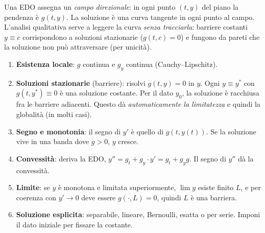 \documentclass[11pt,a4paper,openany]{book}
\theoremstyle{plain}
\theoremstyle{definition}
\theoremstyle{remark}
\begin{document}
\begin{nota}[title={Intuizione}]
Una EDO assegna un \emph{campo direzionale}: in ogni punto $(t,y)$
del piano la pendenza \`e $g(t,y)$. La soluzione \`e una curva tangente
in ogni punto al campo. L'analisi qualitativa serve a leggere la curva
\emph{senza tracciarla}: barriere costanti $y\equiv c$ corrispondono
a soluzioni stazionarie ($g(t,c)=0$) e fungono da pareti che la soluzione
non pu\`o attraversare (per unicit\`a).
\end{nota}

\begin{ricetta}[title={Cauchy qualitativo}]
\begin{enumerate}
\item \textbf{Esistenza locale}: $g$ continua e $g_y$ continua (Cauchy--Lipschitz).
\item \textbf{Soluzioni stazionarie} (barriere): risolvi $g(t,y)=0$ in $y$.
   Ogni $y\equiv y^*$ con $g(t,y^*)\equiv 0$ \`e una soluzione costante.
   Per il dato $y_0$, la soluzione \`e racchiusa fra le barriere
   adiacenti. Questo d\`a \emph{automaticamente la limitatezza} e quindi
   la globalit\`a (in molti casi).
\item \textbf{Segno e monotonia}: il segno di $y'$ \`e quello di
   $g(t,y(t))$. Se la soluzione vive in una banda dove $g>0$,
   $y$ cresce.
\item \textbf{Convessit\`a}: deriva la EDO,
   $y''=g_t+g_y\cdot y'=g_t+g_y g$. Il segno di $y''$ d\`a la convessit\`a.
\item \textbf{Limite}: se $y$ \`e monotona e limitata superiormente,
   $\lim y$ esiste finito $L$, e per coerenza con $y'\to 0$ deve essere
   $g(\cdot,L)=0$, quindi $L$ \`e una barriera.
\item \textbf{Soluzione esplicita}: separabile, lineare, Bernoulli,
   esatta o per serie. Imponi il dato iniziale per fissare la costante.
\end{enumerate}
\end{ricetta}
\end{document}
